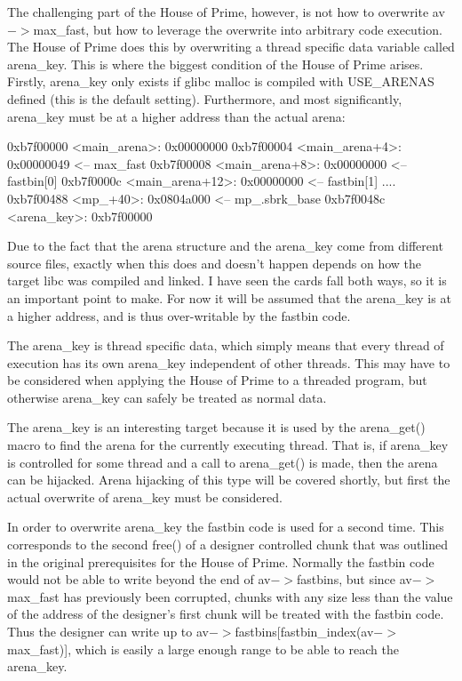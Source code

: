 \documentclass[12pt]{article}
\begin{document}
The challenging part of the House of Prime, however, is not how to
overwrite av$->$max\_fast, but how to leverage the overwrite into
arbitrary code execution. The House of Prime does this by
overwriting a thread specific data variable called arena\_key. This
is where the biggest condition of the House of Prime arises.
Firstly, arena\_key only exists if glibc malloc is compiled with
USE\_ARENAS defined (this is the default setting). Furthermore, and
most significantly, arena\_key must be at a higher address than the
actual arena:
\begin{verbnobox}[\small]
0xb7f00000 <main_arena>:        0x00000000
0xb7f00004 <main_arena+4>:      0x00000049      <-- max\_fast
0xb7f00008 <main_arena+8>:      0x00000000      <-- fastbin[0]
0xb7f0000c <main_arena+12>:     0x00000000      <-- fastbin[1]
....
0xb7f00488 <mp_+40>:            0x0804a000      <-- mp_.sbrk_base
0xb7f0048c <arena\_key>:         0xb7f00000
\end{verbnobox}

Due to the fact that the arena structure and the arena\_key come
from different source files, exactly when this does and doesn't
happen depends on how the target libc was compiled and linked. I
have seen the cards fall both ways, so it is an important point to
make. For now it will be assumed that the arena\_key is at a higher
address, and is thus over-writable by the fastbin code.

The arena\_key is thread specific data, which simply means that
every thread of execution has its own arena\_key independent of
other threads. This may have to be considered when applying the
House of Prime to a threaded program, but otherwise arena\_key can
safely be treated as normal data.

The arena\_key is an interesting target because it is used by the
arena\_get() macro to find the arena for the currently executing
thread. That is, if arena\_key is controlled for some thread and a
call to arena\_get() is made, then the arena can be hijacked. Arena
hijacking of this type will be covered shortly, but first the
actual overwrite of arena\_key must be considered.

In order to overwrite arena\_key the fastbin code is used for a
second time. This corresponds to the second free() of a designer
controlled chunk that was outlined in the original prerequisites
for the House of Prime. Normally the fastbin code would not be able
to write beyond the end of av$->$fastbins, but since av$->$max\_fast has
previously been corrupted, chunks with any size less than the value
of the address of the designer's first chunk will be treated with
the fastbin code. Thus the designer can write up to av$->$fastbins[fastbin\_index(av$->$max\_fast)], which is easily a large
enough range to be able to reach the arena\_key.
\end{document}
